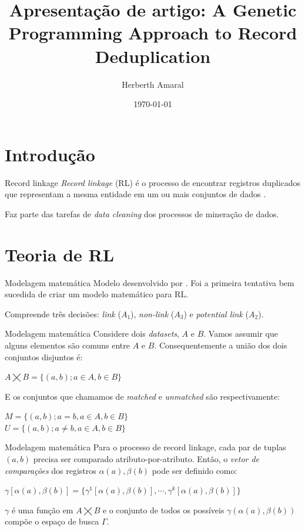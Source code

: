 \documentclass{beamer}
\title{Apresentação de artigo: A Genetic Programming Approach to Record Deduplication}
\date{\today}
\author{Herberth Amaral}
\institute{Programa de Pós-Graduação em Modelagem Computacional e Sistemas - UNIMONTES}
\begin{document}
  \maketitle

  \section{Introdução}

  \begin{frame}{Record linkage}
      \textit{Record linkage} (RL) é o processo de encontrar registros duplicados que representam a mesma entidade em um ou mais conjuntos de dados \cite{survey}.

      Faz parte das tarefas de \textit{data cleaning} dos processos de mineração de dados.
  \end{frame}

  \section{Teoria de RL}

  \begin{frame}{Modelagem matemática}
      Modelo desenvolvido por \cite{fellegi69}. Foi a primeira tentativa bem sucedida de criar um modelo matemático para RL.

      Compreende três decisões: \textit{link} ($A_1$), \textit{non-link} ($A_3$) e \textit{potential link} ($A_2$). 

  \end{frame}

  \begin{frame}{Modelagem matemática}
      Considere dois \textit{datasets}, $A$ e $B$. Vamos assumir que alguns elementos são comuns entre $A$ e $B$. Consequentemente a união dos dois conjuntos disjuntos é:
      \begin{center}
          $A \bigtimes B = \{(a,b); a \in A, b \in B\}$
      \end{center}
      E os conjuntos que chamamos de \textit{matched} e \textit{unmatched} são respectivamente:
      \begin{center}
          $M = \{(a,b); a=b, a \in A, b \in B\}$ \\
          $U = \{(a,b); a \neq b, a \in A, b \in B\}$
      \end{center}

  \end{frame}
  \begin{frame}{Modelagem matemática}
      Para o processo de record linkage, cada par de tuplas $(a,b)$ precisa ser comparado atributo-por-atributo. Então, o \textit{vetor de comparações} dos registros $\alpha(a), \beta(b)$ pode ser definido como:
      \begin{center}
          $\gamma[\alpha(a),\beta(b)] = \{\gamma^1[\alpha(a), \beta(b)],\cdots, \gamma^k[\alpha(a), \beta(b)]\}$
      \end{center}
      $\gamma$ é uma função em $A \bigtimes B$ e o conjunto de todos os possíveis $\gamma(\alpha(a),\beta(b))$ compõe o espaço de busca $\Gamma$.
  \end{frame}
\end{document}
